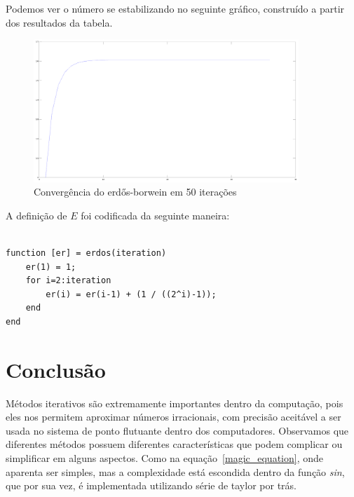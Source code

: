 \documentclass[a4paper]{article}
\begin{document}
Podemos ver o número se estabilizando no seguinte gráfico, construído a partir
dos resultados da tabela.

\begin{figure}[H]
    \centering
    \includegraphics[width=100mm]{erdos.png}
    \caption{Convergência do erdős-borwein em 50 iterações}
	\label{erdos_graphic}
\end{figure}

A definição de $E$ foi codificada da seguinte maneira:

\begin{lstlisting}

function [er] = erdos(iteration)
	er(1) = 1;
	for i=2:iteration
		er(i) = er(i-1) + (1 / ((2^i)-1));
	end
end

\end{lstlisting}

\section{Conclusão}

Métodos iterativos são extremamente importantes dentro da computação, pois eles
nos permitem aproximar números irracionais, com precisão aceitável a ser usada
no sistema de ponto flutuante dentro dos computadores. Observamos que diferentes
métodos possuem diferentes características que podem complicar ou simplificar em
alguns aspectos. Como na equação~\ref{magic_equation}, onde aparenta ser
simples, mas a complexidade está escondida dentro da função \emph{sin}, que por
sua vez, é implementada utilizando série de taylor por trás.



\end{document}
